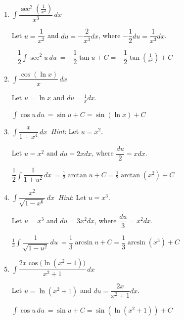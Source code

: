 \documentclass{article}
\begin{document}
\begin{enumerate}
\item $\displaystyle \int \dfrac{\sec^2\left({\frac{1}{x^2}}\right)}{x^3}\,dx\ $

\begin{solution}
    Let $u=\dfrac{1}{x^2}$ and $du=-\dfrac{2}{x^3}dx$, where $-\dfrac{1}{2}du=\dfrac{1}{x^3}dx$.

   $\displaystyle -\dfrac{1}{2}\int \sec^2u\,du\ = -\dfrac{1}{2}\tan u +C=-\dfrac{1}{2}\tan \left(\frac{1}{x^2}\right) +C$
   
\end{solution}
\pspace{\vfill}
\item $\displaystyle \int \dfrac{\cos(\ln x)}{x}\,dx\ $

\begin{solution}
    Let $u=\ln x$ and $du=\frac{1}{x}dx$.

    $\displaystyle \int \cos u\,du\ = \sin u +C = \sin (\ln x)+C$
\end{solution}

\pspace{\vfill}
\item $\displaystyle \int \dfrac{x}{1+x^4}\,dx\ $ \textit{Hint}: Let $u=x^2$.

\begin{solution}
 Let $u=x^2$ and $du=2xdx$, where $\dfrac{du}{2}=xdx$.

$\displaystyle \dfrac{1}{2} \int \dfrac{1}{1+u^2}\,dx\ = \frac{1}{2}\arctan u +C = \frac{1}{2}\arctan(x^2) +C$
 
\end{solution}
\pspace{\vfill}

\item $\displaystyle \int \dfrac{x^2}{\sqrt{1-x^6}}\,dx\ $ \textit{Hint}: Let $u=x^3$.

\begin{solution}
    Let $u=x^3$ and $du=3x^2dx$, where $\dfrac{du}{3}=x^2dx$.

    $\displaystyle \frac{1}{3} \int \dfrac{1}{\sqrt{1-u^2}}\,du\ =\dfrac{1}{3}\arcsin u +C = \dfrac{1}{3}\arcsin (x^3) +C $
\end{solution}
\pspace{\vfill}
\pspace{\newpage}
\item $\displaystyle \int \dfrac{2x\cos\big(\ln (x^2+1)\big)}{x^2+1}\,dx\ $

\begin{solution}
    Let $u=\ln(x^2+1)$ and $du=\dfrac{2x}{x^2+1}dx$.

    $\displaystyle \int \cos u\,du\ = \sin u+C=\sin(\ln(x^2+1))+C$
\end{solution}
\pspace{\vfill}


\end{enumerate}
\end{document}
